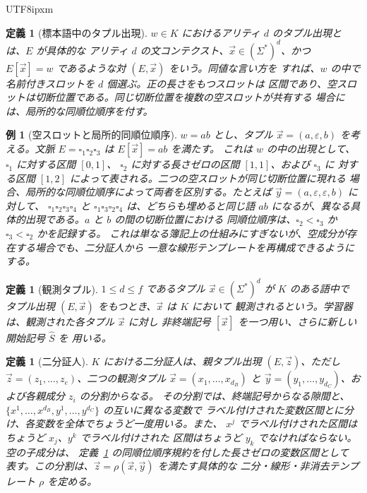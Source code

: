 \documentclass[10pt,a4paper]{article}
\newtheorem{definition}[theorem]{定義}
\newtheorem{example}[theorem]{例}
\theoremstyle{remark}
\newcommand{\tuple}[1]{\vec{#1}}
\newcommand{\blank}{\square}
\newcommand{\eps}{\varepsilon}
\begin{document}
\begin{CJK}{UTF8}{ipxm}
\begin{definition}[標本語中のタプル出現]
\label{def:tuple-occurrence}
\(w\in K\) におけるアリティ \(d\) のタプル出現とは、\(E\) が具体的な
アリティ \(d\) の文コンテクスト、\(\tuple x\in(\Sigma^*)^d\)、かつ
\(E[\tuple x]=w\) であるような対 \((E,\tuple x)\) をいう。同値な言い方を
すれば、\(w\) の中で名前付きスロットを \(d\) 個選ぶ。正の長さをもつスロットは
区間であり、空スロットは切断位置である。同じ切断位置を複数の空スロットが共有する
場合には、局所的な同順位順序を付す。
\end{definition}

\begin{example}[空スロットと局所的同順位順序]
\label{ex:empty-slots}
\(w=ab\) とし、タプル \(\tuple x=(a,\eps,b)\) を考える。文脈
\(E=\blank_1\blank_2\blank_3\) は \(E[\tuple x]=ab\) を満たす。
これは \(w\) の中の出現として、\(\blank_1\) に対する区間 \([0,1]\)、
\(\blank_2\) に対する長さゼロの区間 \([1,1]\)、および \(\blank_3\) に
対する区間 \([1,2]\) によって表される。二つの空スロットが同じ切断位置に現れる
場合、局所的な同順位順序によって両者を区別する。たとえば
\(\tuple y=(a,\eps,\eps,b)\) に対して、
\(\blank_1\blank_2\blank_3\blank_4\) と
\(\blank_1\blank_3\blank_2\blank_4\) は、どちらも埋めると同じ語 \(ab\)
になるが、異なる具体的出現である。\(a\) と \(b\) の間の切断位置における
同順位順序は、\(\blank_2<\blank_3\) か \(\blank_3<\blank_2\) かを記録する。
これは単なる簿記上の仕組みにすぎないが、空成分が存在する場合でも、二分証人から
一意な線形テンプレートを再構成できるようにする。
\end{example}

\begin{definition}[観測タプル]
\label{def:observed-tuple}
\(1\le d\le f\) であるタプル \(\tuple x\in(\Sigma^*)^d\) が \(K\) のある語中で
タプル出現 \((E,\tuple x)\) をもつとき、\(\tuple x\) は \(K\) において
\emph{観測される}という。学習器は、観測された各タプル \(\tuple x\) に対し
非終端記号 \([\tuple x]\) を一つ用い、さらに新しい開始記号 \(\widehat S\) を
用いる。
\end{definition}

\begin{definition}[二分証人]
\label{def:binary-witness}
\(K\) における二分証人は、親タプル出現 \((E,\tuple z)\)、ただし
\(\tuple z=(z_1,\ldots,z_e)\)、二つの観測タプル
\(\tuple x=(x_1,\ldots,x_{d_B})\) と
\(\tuple y=(y_1,\ldots,y_{d_C})\)、および各親成分 \(z_i\) の分割からなる。
その分割では、終端記号からなる隙間と、
\(\{x^1,\ldots,x^{d_B},y^1,\ldots,y^{d_C}\}\) の互いに異なる変数で
ラベル付けされた変数区間とに分け、各変数を全体でちょうど一度用いる。また、
\(x^j\) でラベル付けされた区間はちょうど \(x_j\)、\(y^k\) でラベル付けされた
区間はちょうど \(y_k\) でなければならない。空の子成分は、
定義~\ref{def:tuple-occurrence} の同順位順序規約を付した長さゼロの変数区間として
表す。この分割は、\(\tuple z=\rho(\tuple x,\tuple y)\) を満たす具体的な
二分・線形・非消去テンプレート \(\rho\) を定める。
\end{definition}


\end{CJK}
\end{document}
